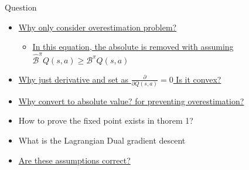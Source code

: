 \documentclass[11pt]{beamer}
\newcommand{\mc}[1]{\mathcal{#1}}
\begin{document}
\begin{frame}{Question}
  \begin{itemize}
    \item \hyperlink{text:why_only_consider_overestimation}{Why only consider overestimation problem?}
    \begin{itemize}
      \item \hyperlink{text:why_assume_overestimation}{In this equation, the absolute is removed with assuming $\hat{\mc{B}}^\pi Q(s,a) \geq \mc{B}^\pi Q(s,a)$}
    \end{itemize}
    \item \hyperlink{thm:1_derivative}{Why just derivative and set as $\frac{\partial}{\partial Q(s,a)} = 0$ Is it convex?}
    \item \hyperlink{thm:2_absolute}{Why convert to absolute value? for preventing overestimation?}
    \item How to prove the fixed point exists in thorem 1?
    \item What is the Lagrangian Dual gradient descent
    \item \hyperlink{thm:3_3_assumption}{Are these assumptions correct?}
  \end{itemize}
\end{frame}
\end{document}
